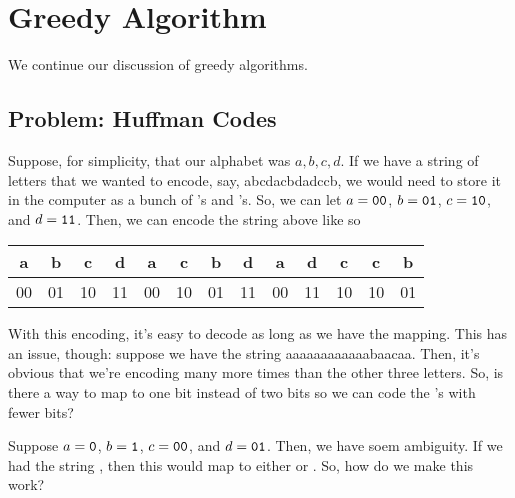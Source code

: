 \documentclass[letterpaper]{article}
\begin{document}
\section{Greedy Algorithm}
We continue our discussion of greedy algorithms.

\subsection{Problem: Huffman Codes}
Suppose, for simplicity, that our alphabet was $a, b, c, d$. If we have a string of letters that we wanted to encode, say, abcdacbdadccb, we would need to store it in the computer as a bunch of 's and 's. So, we can let $a = \texttt{00}$, $b = \texttt{01}$, $c = \texttt{10}$, and $d = \texttt{11}$. Then, we can encode the string above like so 
\begin{center}
    \begin{tabular}{c c c c c c c c c c c c c}
        a & b & c & d & a & c & b & d & a & d & c & c & b \\ 
        \hline 
        00 & 01 & 10 & 11 & 00 & 10 & 01 & 11 & 00 & 11 & 10 & 10 & 01 
    \end{tabular}
\end{center}
With this encoding, it's easy to decode as long as we have the mapping. This has an issue, though: suppose we have the string aaaaaaaaaaaabaacaa. Then, it's obvious that we're encoding  many more times than the other three letters. So, is there a way to map  to one bit instead of two bits so we can code the 's with fewer bits? 

\bigskip 

Suppose $a = \texttt{0}$, $b = \texttt{1}$, $c = \texttt{00}$, and $d = \texttt{01}$. Then, we have soem ambiguity. If we had the string , then this would map to either  or . So, how do we make this work?  

\bigskip 
\end{document}
